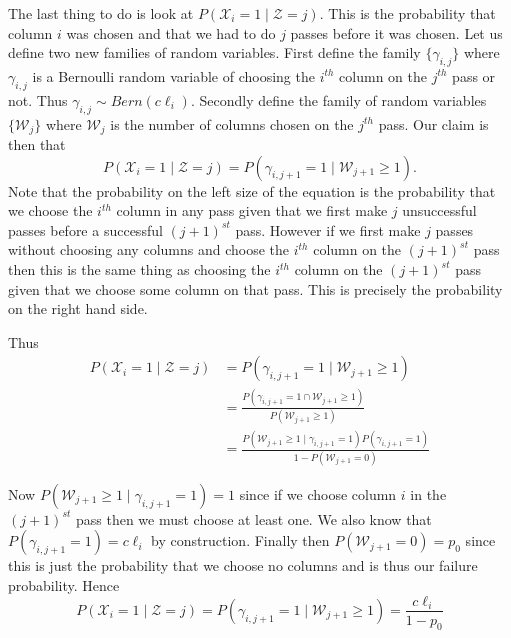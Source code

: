 \documentclass{book}
\begin{document}
The last thing to do is look at $P(\mathscr{X}_i=1 \mid \mathscr{Z}=j)$. This is the probability that column $i$ was chosen and that we had to do $j$ passes before it was chosen. Let us define two new families of random variables. First define the family $\{\gamma_{i,j}\}$ where $\gamma_{i,j}$ is a Bernoulli random variable of choosing the $i^{th}$ column on the $j^{th}$ pass or not. Thus $\gamma_{i,j}\sim Bern\left(c\ell_i\right)$. Secondly define the family of random variables $\{\mathscr{W}_j\}$ where $\mathscr{W}_j$ is the number of columns chosen on the $j^{th}$ pass. Our claim is then that 
$$
P(\mathscr{X}_i=1 \mid \mathscr{Z}=j)=P(\gamma_{i,j+1}=1 \mid \mathscr{W}_{j+1}\geq 1).
$$
Note that the probability on the left size of the equation is the probability that we choose the $i^{th}$ column in any pass given that we first make $j$ unsuccessful passes before a successful $(j+1)^{st}$ pass. However if we first make $j$ passes without choosing any columns and choose the $i^{th}$ column on the $(j+1)^{st}$ pass then this is the same thing as choosing the $i^{th}$ column on the $(j+1)^{st}$ pass given that we choose some column on that pass. This is precisely the probability on the right hand side. 

Thus
$$
\begin{aligned}
P(\mathscr{X}_i=1 \mid \mathscr{Z}=j)&=P(\gamma_{i,j+1}=1 \mid \mathscr{W}_{j+1}\geq 1)\\
&=\frac{P(\gamma_{i,j+1}=1 \cap \mathscr{W}_{j+1}\geq 1)}{P(\mathscr{W}_{j+1}\geq 1)}\\
&=\frac{P(\mathscr{W}_{j+1}\geq 1 \mid \gamma_{i,j+1}=1)P(\gamma_{i,j+1}=1)}{1-P(\mathscr{W}_{j+1}=0)}
\end{aligned}
$$

Now $P(\mathscr{W}_{j+1}\geq 1 \mid \gamma_{i,j+1}=1)=1$ since if we choose column $i$ in the $(j+1)^{st}$ pass then we must choose at least one. We also know that $P(\gamma_{i,j+1}=1)=c\ell_i$ by construction. Finally then $P(\mathscr{W}_{j+1}=0)=p_0$ since this is just the probability that we choose no columns and is thus our failure probability. Hence
$$
P(\mathscr{X}_i=1 \mid \mathscr{Z}=j)=P(\gamma_{i,j+1}=1 \mid \mathscr{W}_{j+1}\geq 1)=\frac{c\ell_i}{1-p_0}
$$

\end{document}
